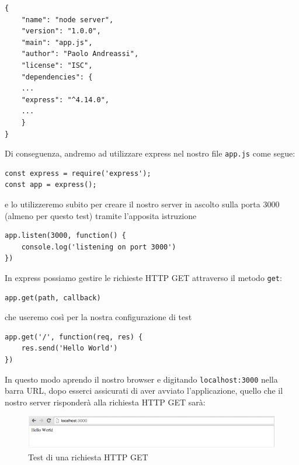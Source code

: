 \begin{lstlisting}[caption={test installazione express}, style=javaScriptCode]
{
	"name": "node server",
	"version": "1.0.0",
	"main": "app.js",
	"author": "Paolo Andreassi",
	"license": "ISC",
	"dependencies": {
	...
	"express": "^4.14.0",
	...
	}
}

\end{lstlisting}
Di conseguenza, andremo ad utilizzare express nel nostro file \texttt{app.js} come segue:
\begin{lstlisting}[caption={test require express}, style=javaScriptCode]
const express = require('express');
const app = express();
\end{lstlisting}
e lo utilizzeremo subito per creare il nostro server in ascolto sulla porta 3000 (almeno per questo test) tramite l'apposita istruzione
\begin{lstlisting}[caption={test server express}, style=javaScriptCode]
app.listen(3000, function() {
	console.log('listening on port 3000')
})
\end{lstlisting}
In express possiamo gestire le richieste HTTP GET attraverso il metodo \texttt{get}:
\begin{lstlisting}[style=javaScriptCode]
app.get(path, callback)
\end{lstlisting}
che useremo così per la nostra configurazione di test
\begin{lstlisting}[caption={test hello world}, style=javaScriptCode]
app.get('/', function(req, res) {
	res.send('Hello World')
})
\end{lstlisting}
In questo modo aprendo il nostro browser e digitando \texttt{localhost:3000} nella barra URL, dopo esserci assicurati di aver avviato l'applicazione, quello che il nostro server risponderà alla richiesta HTTP GET sarà:
\begin{figure}[h]
	\centering
	\includegraphics[scale=0.8]{Immagini/test_hello_world.png}
	\caption{Test di una richiesta HTTP GET}
\end{figure}

